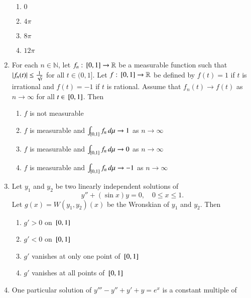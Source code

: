\documentclass[journal,12pt,onecolumn]{IEEEtran}
\theoremstyle{remark}
\begin{document}
\begin{enumerate}
\begin{enumerate}[label=(\Alph*)]
\item $0$
\item $4\pi$
\item $8\pi$
\item $12\pi$
\end{enumerate}

\item For each $n \in \mathbb{N}$, let $f_n : {}\left[0,1\right] \to \mathbb{R}$ be a measurable function such that  
$\left\vert f_n(t)\right\vert \le \frac{1}{\sqrt{t}}$ for all $t \in (0,1]$.  
Let $f : {}\left[0,1\right] \to \mathbb{R}$ be defined by  
$f(t) = 1$ if $t$ is irrational and $f(t) = -1$ if $t$ is rational.  
Assume that $f_n(t) \to f(t)$ as $n \to \infty$ for all $t \in {}\left[0,1\right]$.  
Then
\\[-0.3em]\makebox[\textwidth][r]{\textit{[GATE EE 2025]}}

\begin{enumerate}[label=(\Alph*)]
\item $f$ is not measurable
\item $f$ is measurable and $\int_{{}\left[0,1\right]} f_n \, d\mu \to 1$ as $n \to \infty$
\item $f$ is measurable and $\int_{{}\left[0,1\right]} f_n \, d\mu \to 0$ as $n \to \infty$
\item $f$ is measurable and $\int_{{}\left[0,1\right]} f_n \, d\mu \to -1$ as $n \to \infty$
\end{enumerate}

\item Let $y_1$ and $y_2$ be two linearly independent solutions of
\[
y'' + (\sin x) y = 0, \quad 0 \le x \le 1.
\]
Let $g(x) = W(y_1,y_2)(x)$ be the Wronskian of $y_1$ and $y_2$. Then
\\[-0.3em]\makebox[\textwidth][r]{\textit{[GATE EE 2025]}}

\begin{enumerate}[label=(\Alph*)]
\item $g' > 0$ on ${}\left[0,1\right]$
\item $g' < 0$ on ${}\left[0,1\right]$
\item $g'$ vanishes at only one point of ${}\left[0,1\right]$
\item $g'$ vanishes at all points of ${}\left[0,1\right]$
\end{enumerate}

\item One particular solution of $y''' - y'' + y' + y = e^x$ is a constant multiple of
\\[-0.3em]\makebox[\textwidth][r]{\textit{[GATE EE 2025]}}


\end{enumerate}
\end{document}

